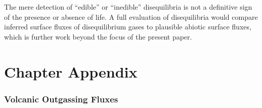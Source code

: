 The mere detection of ``edible'' or ``inedible'' disequilibria is not a definitive sign of the presence or absence of life.  A full evaluation of disequilibria would compare inferred surface fluxes of disequilibrium gases to plausible abiotic surface fluxes, which is further work beyond the focus of the present paper.

\section{Chapter Appendix}

\subsubsection{Volcanic Outgassing Fluxes}

